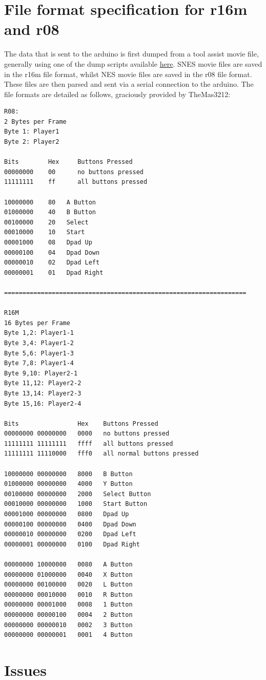 \documentclass{article}
\begin{document}
\section{File format specification for r16m and r08}
The data that is sent to the arduino is first dumped from a tool assist movie file, generally using one of the dump scripts available \href{https://github.com/dwangoac/TASBot-Projects/tree/master/Dump_Scripts}{here}.  SNES movie files are saved in the r16m file format, whilst NES movie files are saved in the r08 file format.  These files are then parsed and sent via a serial connection to the arduino.  The file formats are detailed as follows, graciously provided by TheMas3212:
\begin{verbatim}
R08: 
2 Bytes per Frame 
Byte 1: Player1
Byte 2: Player2 

Bits        Hex     Buttons Pressed
00000000    00      no buttons pressed
11111111    ff      all buttons pressed

10000000    80   A Button
01000000    40   B Button
00100000    20   Select
00010000    10   Start
00001000    08   Dpad Up
00000100    04   Dpad Down
00000010    02   Dpad Left
00000001    01   Dpad Right

==================================================================

R16M
16 Bytes per Frame
Byte 1,2: Player1-1
Byte 3,4: Player1-2
Byte 5,6: Player1-3
Byte 7,8: Player1-4
Byte 9,10: Player2-1
Byte 11,12: Player2-2
Byte 13,14: Player2-3
Byte 15,16: Player2-4

Bits                Hex    Buttons Pressed
00000000 00000000   0000   no buttons pressed
11111111 11111111   ffff   all buttons pressed
11111111 11110000   fff0   all normal buttons pressed

10000000 00000000   8000   B Button
01000000 00000000   4000   Y Button
00100000 00000000   2000   Select Button
00010000 00000000   1000   Start Button
00001000 00000000   0800   Dpad Up
00000100 00000000   0400   Dpad Down
00000010 00000000   0200   Dpad Left
00000001 00000000   0100   Dpad Right

00000000 10000000   0080   A Button
00000000 01000000   0040   X Button
00000000 00100000   0020   L Button
00000000 00010000   0010   R Button
00000000 00001000   0008   1 Button
00000000 00000100   0004   2 Button
00000000 00000010   0002   3 Button
00000000 00000001   0001   4 Button

\end{verbatim}


\section{Issues}
\end{document}
